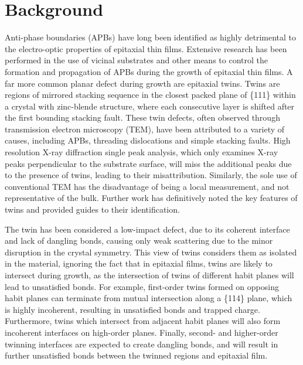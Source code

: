 \section{Background}
Anti-phase boundaries (APBs) have long been identified as highly detrimental to the electro-optic properties of epitaxial thin films\cite{Holt1969a}.
Extensive research has been performed in the use of vicinal substrates and other means\cite{Kroemer1987} to control the formation and propagation of APBs during the growth of epitaxial thin films.
A far more common planar defect during growth are epitaxial twins\cite{Ernst1989}.
Twins are regions of mirrored stacking sequence in the closest packed plane of \{111\} within a crystal with zinc-blende structure, where each consecutive layer is shifted after the first bounding stacking fault\cite{Wagner1966}.
These twin defects, often observed through transmission electron microscopy (TEM), have been attributed to a variety of causes, including APBs, threading dislocations and simple stacking faults\cite{Toyota2008b,Kim2006a,Xu2009,Proessdorf2010,Fischer1986a,Nguyen2004,Noge1987,Vila1995,Fischer1986}.
High resolution X-ray diffraction single peak analysis, which only examines X-ray peaks perpendicular to the substrate surface, will miss the additional peaks due to the presence of twins, leading to their misattribution.
Similarly, the sole use of conventional TEM has the disadvantage of being a local measurement, and not representative of the bulk.
Further work has definitively noted the key features of twins and provided guides to their identification\cite{Ernst1989}.

The twin has been considered a low-impact defect, due to its coherent interface and lack of dangling bonds, causing only weak scattering due to the minor disruption in the crystal symmetry.
This view of twins considers them as isolated in the material, ignoring the fact that in epitaxial films, twins are likely to intersect during growth, as the intersection of twins of different habit planes will lead to unsatisfied bonds.
For example, first-order twins formed on opposing habit planes can terminate from mutual intersection along a \{114\} plane, which is highly incoherent, resulting in unsatisfied bonds and trapped charge\cite{HORNSTRA1959}.
Furthermore, twins which intersect from adjacent habit planes will also form incoherent interfaces on high-order planes.
Finally, second- and higher-order twinning interfaces are expected to create dangling bonds, and will result in further unsatisfied bonds between the twinned regions and epitaxial film.

